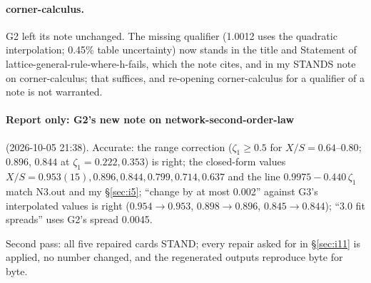 \documentclass[11pt]{article}
\begin{document}
\paragraph{corner-calculus.} G2 left its note unchanged. The missing qualifier (1.0012 uses the quadratic
interpolation; 0.45\% table uncertainty) now stands in the title and Statement of lattice-general-rule-where-h-fails,
which the note cites, and in my STANDS note on corner-calculus; that suffices, and re-opening corner-calculus for a
qualifier of a note is not warranted.

\paragraph{Report only: G2's new note on network-second-order-law} (2026-10-05 21:38). Accurate: the range
correction ($\zeta_1\ge0.5$ for $X/S=0.64$--$0.80$; $0.896$, $0.844$ at $\zeta_1=0.222,0.353$) is right; the closed-form
values $X/S=0.953(15),0.896,0.844,0.799,0.714,0.637$ and the line $0.9975-0.440\,\zeta_1$ match N3.out and my
\S\ref{sec:i5}; ``change by at most 0.002'' against G3's interpolated values is right ($0.954\to0.953$,
$0.898\to0.896$, $0.845\to0.844$); ``3.0 fit spreads'' uses G2's spread 0.0045.
\begin{verdictok}
Second pass: all five repaired cards STAND; every repair asked for in \S\ref{sec:i11} is applied, no number changed,
and the regenerated outputs reproduce byte for byte.
\end{verdictok}
\end{document}
